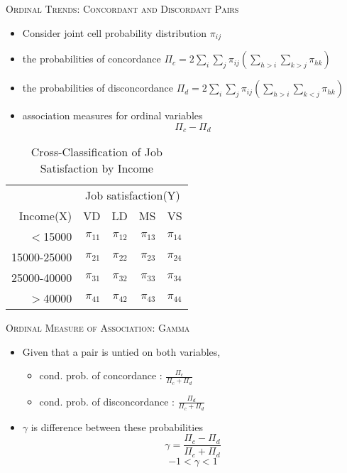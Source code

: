 \documentclass[dvipdfmx, serif,handout]{beamer}
\begin{document}
\begin{frame}{\textsc{Ordinal Trends: Concordant and Discordant Pairs}}
\begin{itemize}
\item Consider joint cell probability distribution $\pi_{ij}$
\end{itemize}

\begin{itemize}
\item the probabilities of concordance
$\Pi_{c} = 2 \sum_{i} \sum_{j} \pi_{ij}(\sum_{h>i} \sum_{k>j} \pi_{hk})$
\item the probabilities of disconcordance
$\Pi_{d} = 2 \sum_{i} \sum_{j} \pi_{ij}(\sum_{h>i} \sum_{k<j} \pi_{hk})$
\item association measures for ordinal variables 
$$\Pi_c - \Pi_d$$
\end{itemize}


{\scriptsize
\begin{table} %
\begin{tabular}{rrrrr}
  \hline
 & \multicolumn{4}{c}{Job satisfaction(Y)}\\ 
Income(X) & VD & LD & MS & VS \\ 
  \hline
$<$15000 	& $\pi_{11}$ 		& $\pi_{12}$ 	& $\pi_{13}$ 	 		& $\pi_{14}$ \\ 
  15000-25000 	& $\pi_{21}$ 		& $\pi_{22}$ 	& $\pi_{23}$  		& $\pi_{24}$ \\ 
  25000-40000 	& $\pi_{31}$ 		& $\pi_{32}$ 	& $\pi_{33}$  		& $\pi_{34}$  \\ 
  $>$40000 	& $\pi_{41}$ 		& $\pi_{42}$ 	& $\pi_{43}$ 			& $\pi_{44}$  \\ 
   \hline
\end{tabular}
\caption{\scriptsize Cross-Classification of Job Satisfaction by Income}
\end{table}
}


\end{frame}
\begin{frame}{\textsc{Ordinal Measure of Association: Gamma}}
\begin{itemize}
\item Given that a pair is untied on both variables, 
\begin{itemize}
\item cond. prob. of  concordance : $\frac{\Pi_c}{\Pi_c + \Pi_d}$
\item cond. prob. of disconcordance : $\frac{\Pi_d}{\Pi_c + \Pi_d}$
\end{itemize}
\item $\gamma$ is  difference between these probabilities
$$\gamma=\frac{\Pi_c-\Pi_d}{\Pi_c + \Pi_d}$$
$$-1<\gamma<1$$
\end{itemize}

\end{frame}
\end{document}
